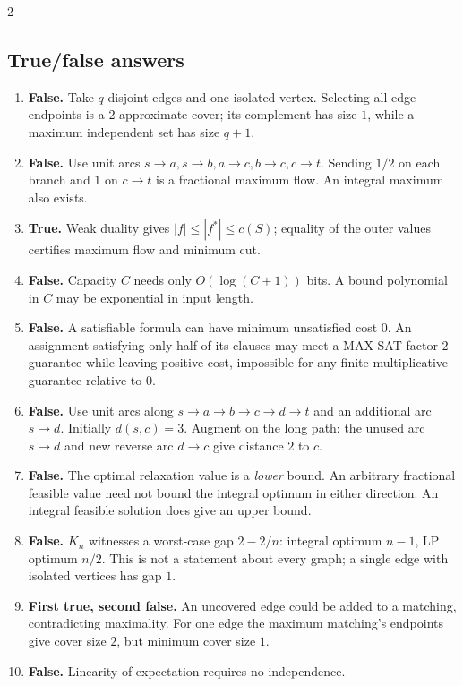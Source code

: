 \documentclass[10pt]{article}
\theoremstyle{definition}
\begin{document}
\begin{multicols*}{2}
\subsection{True/false answers}
\begin{enumerate}[label=\textbf{T\arabic*.}]
  \item \textbf{False.} Take $q$ disjoint edges and one isolated vertex.
        Selecting all edge endpoints is a 2-approximate cover; its complement
        has size $1$, while a maximum independent set has size $q+1$.
  \item \textbf{False.} Use unit arcs $s\to a,s\to b,a\to c,b\to c,c\to t$.
        Sending $1/2$ on each branch and $1$ on $c\to t$ is a fractional
        maximum flow.  An integral maximum also exists.
  \item \textbf{True.} Weak duality gives $|f|\le|f^*|\le c(S)$;
        equality of the outer values certifies maximum flow and minimum cut.
  \item \textbf{False.} Capacity $C$ needs only $O(\log(C+1))$ bits.
        A bound polynomial in $C$ may be exponential in input length.
  \item \textbf{False.} A satisfiable formula can have minimum unsatisfied
        cost $0$.  An assignment satisfying only half of its clauses may
        meet a MAX-SAT factor-$2$ guarantee while leaving positive cost,
        impossible for any finite multiplicative guarantee relative to $0$.
  \item \textbf{False.} Use unit arcs along $s\to a\to b\to c\to d\to t$
        and an additional arc $s\to d$.  Initially $d(s,c)=3$.  Augment
        on the long path: the unused arc $s\to d$ and new reverse arc
        $d\to c$ give distance $2$ to $c$.
  \item \textbf{False.} The optimal relaxation value is a \emph{lower}
        bound.  An arbitrary fractional feasible value need not bound the
        integral optimum in either direction.  An integral feasible solution
        does give an upper bound.
  \item \textbf{False.} $K_n$ witnesses a worst-case gap $2-2/n$:
        integral optimum $n-1$, LP optimum $n/2$.  This is not a statement
        about every graph; a single edge with isolated vertices has gap $1$.
  \item \textbf{First true, second false.} An uncovered edge could be added
        to a matching, contradicting maximality.  For one edge the maximum
        matching's endpoints give cover size $2$, but minimum cover size $1$.
  \item \textbf{False.} Linearity of expectation requires no independence.
\end{enumerate}



\end{multicols*}
\end{document}
